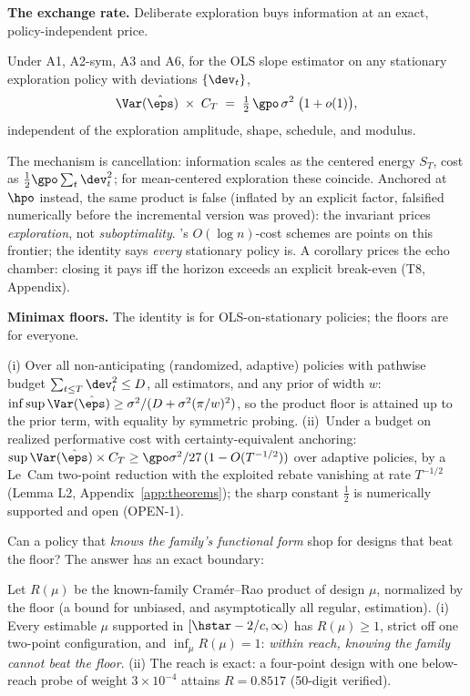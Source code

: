 \documentclass{article}
\begin{document}
\textbf{The exchange rate.} Deliberate exploration buys information at an exact, policy-independent price.

\begin{theorem}
\label{thm:exchange}
Under A1, A2-sym, A3 and A6, for the OLS slope estimator on any stationary exploration policy with deviations $\{\dev_t\}$,
\[
\Var(\hat\eps)\;\times\;C_T \;=\; \tfrac{1}{2}\,\gpo\,\sigma^2\;\big(1 + o(1)\big),
\]
independent of the exploration amplitude, shape, schedule, and modulus.
\end{theorem}

The mechanism is cancellation: information scales as the centered energy $S_T$, cost as $\tfrac{1}{2}\gpo\sum_t \dev_t^2$; for mean-centered exploration these coincide. Anchored at $\hpo$ instead, the same product is false (inflated by an explicit factor, falsified numerically before the incremental version was proved): the invariant prices \emph{exploration}, not \emph{suboptimality}. \citet{lai1979adaptive}'s $O(\log n)$-cost schemes are points on this frontier; the identity says \emph{every} stationary policy is. A corollary prices the echo chamber: closing it pays iff the horizon exceeds an explicit break-even (T8, Appendix).

\textbf{Minimax floors.} The identity is for OLS-on-stationary policies; the floors are for everyone.

\begin{theorem}
\label{thm:devbudget}
(i) Over all non-anticipating (randomized, adaptive) policies with pathwise budget $\sum_{t\le T}\dev_t^2 \le D$, all estimators, and any prior of width $w$: $\inf\sup\Var(\hat\eps) \ge \sigma^2/(D + \sigma^2(\pi/w)^2)$, so the product floor is attained up to the prior term, with equality by symmetric probing. (ii)~Under a budget on realized performative cost with certainty-equivalent anchoring: $\sup \Var(\hat\eps)\times C_T \ge \gpo\sigma^2/27\,(1-O(T^{-1/2}))$ over adaptive policies, by a Le~Cam two-point reduction with the exploited rebate vanishing at rate $T^{-1/2}$ (Lemma L2, Appendix~\ref{app:theorems}); the sharp constant $\tfrac{1}{2}$ is numerically supported and open (OPEN-1).
\end{theorem}

Can a policy that \emph{knows the family's functional form} shop for designs that beat the floor? The answer has an exact boundary:

\begin{theorem}
\label{thm:reach}
Let $R(\mu)$ be the known-family Cram\'er--Rao product of design $\mu$, normalized by the floor (a bound for unbiased, and asymptotically all regular, estimation). (i) Every estimable $\mu$ supported in $[\hstar - 2/c, \infty)$ has $R(\mu) \ge 1$, strict off one two-point configuration, and $\inf_\mu R(\mu) = 1$: \emph{within reach, knowing the family cannot beat the floor}. (ii) The reach is exact: a four-point design with one below-reach probe of weight $3{\times}10^{-4}$ attains $R = 0.8517$ (50-digit verified).
\end{theorem}
\end{document}
